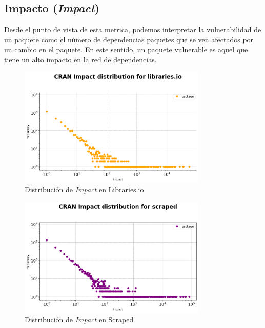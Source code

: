 \subsection{Impacto (\textit{Impact})}

Desde el punto de vista de esta metrica, podemos interpretar la vulnerabilidad de un paquete como el número
de dependencias paquetes que se ven afectados por un cambio en el paquete. En este sentido, un paquete
vulnerable es aquel que tiene un alto impacto en la red de dependencias.

\begin{figure}[ht!]
    \begin{center}
        \includegraphics[width=0.8\textwidth]{img/cran/impact_dist_libio.png}
        \caption{Distribución de \textit{Impact} en Libraries.io}
        \label{fig:Distribución de Impact en Libraries.io}
    \end{center}
\end{figure}

\begin{figure}[ht!]
    \begin{center}
        \includegraphics[width=0.8\textwidth]{img/cran/impact_dist_scraped.png}
        \caption{Distribución de \textit{Impact} en Scraped}
        \label{fig:Distribución de Impact en Scraped}
    \end{center}
\end{figure}

